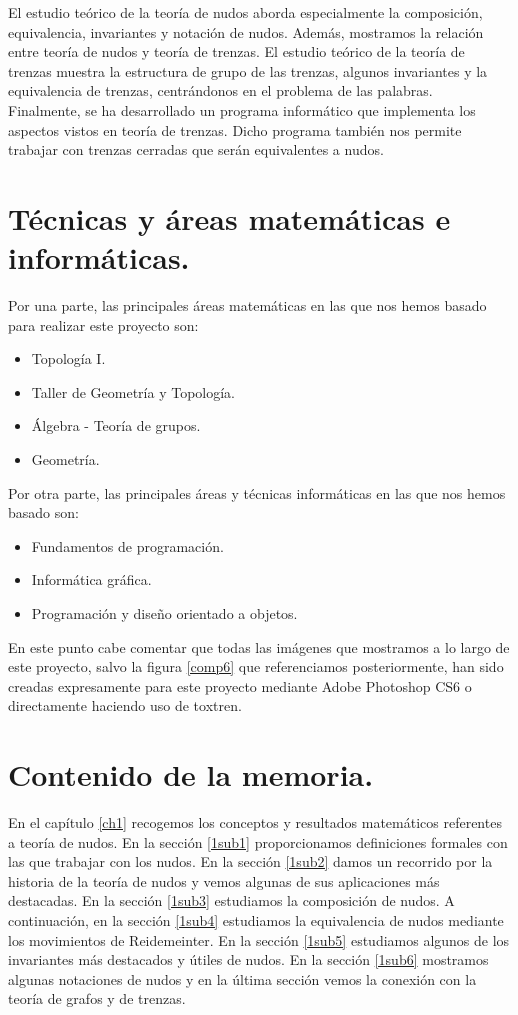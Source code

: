 El estudio teórico de la teoría de nudos aborda especialmente la composición, equivalencia, invariantes y notación de nudos. Además, mostramos la relación entre teoría de nudos y teoría de trenzas. El estudio teórico de la teoría de trenzas muestra la estructura de grupo de las trenzas, algunos invariantes y la equivalencia de trenzas, centrándonos en el problema de las palabras. \\

Finalmente, se ha desarrollado un programa informático que implementa los aspectos vistos en teoría de trenzas. Dicho programa también nos permite trabajar con trenzas cerradas que serán equivalentes a nudos. \\

\section{Técnicas y áreas matemáticas e informáticas.}
Por una parte, las principales áreas matemáticas en las que nos hemos basado para realizar este proyecto son:
\begin{itemize}
	\item Topología I.
	\item Taller de Geometría y Topología.
	\item Álgebra - Teoría de grupos. 
	\item Geometría.
\end{itemize}
Por otra parte, las principales áreas y técnicas informáticas en las que nos hemos basado son:
\begin{itemize}
	\item Fundamentos de programación.
	\item Informática gráfica.
	\item Programación y diseño orientado a objetos. 
\end{itemize}

En este punto cabe comentar que todas las imágenes que mostramos a lo largo de este proyecto, salvo la figura \ref{comp6} que referenciamos posteriormente, han sido creadas expresamente para este proyecto mediante Adobe Photoshop CS6 o directamente haciendo uso de toxtren. 

\section{Contenido de la memoria.}
En el capítulo \ref{ch1} recogemos los conceptos y resultados matemáticos referentes a teoría de nudos. En la sección \ref{1sub1} proporcionamos definiciones formales con las que trabajar con los nudos. En la sección \ref{1sub2} damos un recorrido por la historia de la teoría de nudos y vemos algunas de sus aplicaciones más destacadas. En la sección \ref{1sub3} estudiamos la composición de nudos. A continuación, en la sección \ref{1sub4} estudiamos la equivalencia de nudos mediante los movimientos de Reidemeinter. En la sección \ref{1sub5} estudiamos algunos de los invariantes más destacados y útiles de nudos. En la sección \ref{1sub6} mostramos algunas notaciones de nudos y en la última sección vemos la conexión con la teoría de grafos y de trenzas.\\

